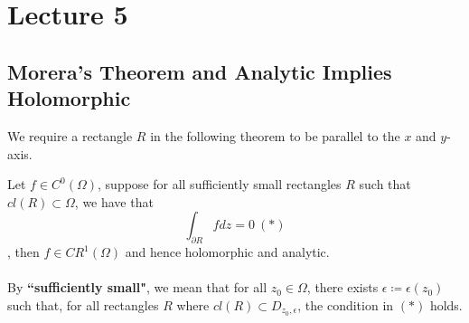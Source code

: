 \section{Lecture 5}

\subsection{Morera's Theorem and Analytic Implies Holomorphic}

\noindent We require a rectangle $R$ in the following theorem to be parallel to the $x$ and $y$-axis.

\begin{theorem}
    Let $f \in C^0(\Omega)$, suppose for all sufficiently small rectangles $R$ such that $cl(R) \subset \Omega$, we have that
    \[\int_{\partial R} f dz = 0\ (*)\]
    , then $f \in CR^1(\Omega)$ and hence holomorphic and analytic.\\\\
    By \textbf{``sufficiently small"}, we mean that for all $z_0 \in \Omega$, there exists $\epsilon \coloneqq \epsilon(z_0)$ such that, for all rectangles $R$ where $cl(R) \subset D_{z_0, \epsilon}$, the condition in $(*)$ holds.
\end{theorem}

